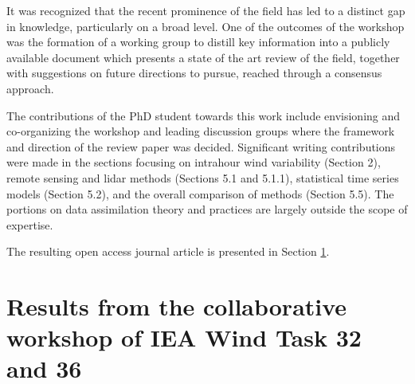 It was recognized that the recent prominence of the field has led to a distinct gap in knowledge, particularly on a broad level. One of the outcomes of the workshop was the formation of a working group to distill key information into a publicly available document which presents a state of the art review of the field, together with suggestions on future directions to pursue, reached through a consensus approach.

The contributions of the PhD student towards this work include envisioning and co-organizing the workshop and leading discussion groups where the framework and direction of the review paper was decided. Significant writing contributions were made in the sections focusing on intrahour wind variability (Section 2), remote sensing and lidar methods (Sections 5.1 and 5.1.1), statistical time series models (Section 5.2), and the overall comparison of methods (Section 5.5). The portions on data assimilation theory and practices are largely outside the scope of expertise.

The resulting open access journal article is presented in Section \ref{sec:IEA_paper}. 


\clearpage
\section{Results from the collaborative workshop of IEA Wind Task 32 and 36}
\label{sec:IEA_paper}
